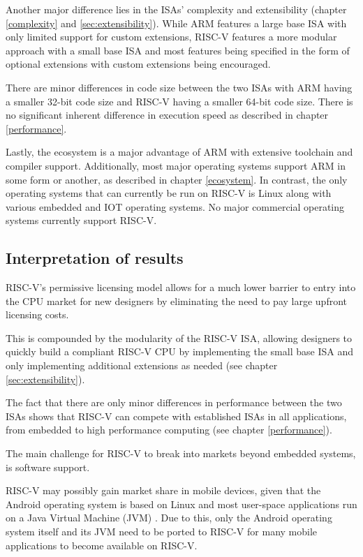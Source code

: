 \documentclass[conference]{IEEEtran}
\begin{document}
	Another major difference lies in the \glspl{ISA}' complexity and extensibility (chapter \ref{complexity} and \ref{sec:extensibility}).
	While ARM features a large base \gls{ISA} with only limited support for custom extensions, RISC-V features a more modular
	approach with a small base \gls{ISA} and most features being specified in the form of optional extensions with custom extensions being
	encouraged.

	There are minor differences in code size between the two \glspl{ISA} with ARM having a smaller 32-bit code size and RISC-V having a
	smaller 64-bit code size. There is no significant inherent difference in execution speed as described in chapter \ref{performance}.

	Lastly, the ecosystem is a major advantage of ARM with extensive toolchain and compiler support. Additionally, most major operating systems
	support ARM in some form or another, as described in chapter \ref{ecosystem}.
	In contrast, the only operating systems that can currently be run on RISC-V is Linux along with various embedded and IOT operating systems.
	No major commercial operating systems currently support RISC-V.

	\subsection{Interpretation of results}
	\label{ref:interpretation}
	RISC-V's permissive licensing model allows for a much lower barrier to entry into the \gls{CPU} market for new designers
	by eliminating the need to pay large upfront licensing costs.
	
	This is compounded by the modularity of the RISC-V \gls{ISA}, allowing designers to quickly build a compliant RISC-V \gls{CPU}
	by implementing the small base \gls{ISA} and only implementing additional extensions as needed (see chapter \ref{sec:extensibility}).

	The fact that there are only minor differences in performance between the two \glspl{ISA} shows that RISC-V can
	compete with established \glspl{ISA} in all applications, from embedded to high performance computing (see chapter \ref{performance}).

	The main challenge for RISC-V to break into markets beyond embedded systems, is software support.
	
	RISC-V may possibly gain market share in mobile devices, given that the Android operating
	system is based on Linux and most user-space applications
	run on a Java Virtual Machine (JVM) \cite{Ehringer2010}. Due to this, only
	the Android operating system itself and its JVM need to be
	ported to RISC-V for many mobile applications to
	become available on RISC-V.
\end{document}
